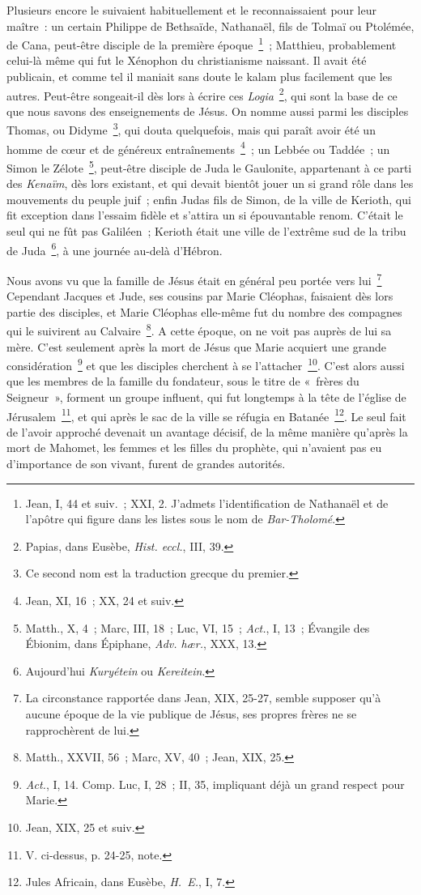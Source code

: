 \documentclass[french,twoside]{book} %
\begin{document}
Plusieurs encore le suivaient habituellement et le reconnaissaient pour leur maître : un certain Philippe de Bethsaïde, Nathanaël, fils de Tolmaï ou Ptolémée, de Cana, peut-être disciple de la première époque \footnote{ Jean, I, 44 et suiv. ; XXI, 2. J’admets l’identification de Nathanaël et de l’apôtre qui figure dans les listes sous le nom de {\itshape Bar-Tholomé}.} ; Matthieu, probablement celui-là même qui fut le Xénophon du christianisme naissant. Il avait été publicain, et comme tel il maniait sans doute le kalam plus facilement que les autres. Peut-être songeait-il dès lors à écrire ces {\itshape Logia} \footnote{ Papias, dans Eusèbe, {\itshape Hist. eccl.}, III, 39.}, qui sont la base de ce que nous savons des enseignements de Jésus. On nomme aussi parmi les disciples Thomas, ou Didyme \footnote{Ce second nom est la traduction grecque du premier.}, qui douta quelquefois, mais qui paraît avoir été un homme de cœur et de généreux entraînements \footnote{Jean, XI, 16 ; XX, 24 et suiv.} ; un Lebbée ou Taddée ; un Simon le Zélote \footnote{ Matth., X, 4 ; Marc, III, 18 ; Luc, VI, 15 ; {\itshape Act.}, I, 13 ; Évangile des Ébionim, dans Épiphane, {\itshape Adv. hær.}, XXX, 13.}, peut-être disciple de Juda le Gaulonite, appartenant à ce parti des {\itshape Kenaïm}, dès lors existant, et qui devait bientôt jouer un si grand rôle dans les mouvements du peuple juif ; enfin Judas fils de Simon, de la ville de Kerioth, qui fit exception dans l’essaim fidèle et s’attira un si épouvantable renom. C’était le seul qui ne fût pas Galiléen ; Kerioth était une ville de l’extrême sud de la tribu de Juda \footnote{ Aujourd’hui {\itshape Kuryétein} ou {\itshape Kereitein}.}, à une journée au-delà d’Hébron.\par
Nous avons vu que la famille de Jésus était en général peu portée vers lui \footnote{La circonstance rapportée dans Jean, XIX, 25-27, semble supposer qu’à aucune époque de la vie publique de Jésus, ses propres frères ne se rapprochèrent de lui.} Cependant Jacques et Jude, ses cousins par Marie Cléophas, faisaient dès lors partie des disciples, et Marie Cléophas elle-même fut du nombre des compagnes qui le suivirent au Calvaire \footnote{Matth., XXVII, 56 ; Marc, XV, 40 ; Jean, XIX, 25.}. A cette époque, on ne voit pas auprès de lui sa mère. C’est seulement après la mort de Jésus que Marie acquiert une grande considération \footnote{{\itshape Act.}, I, 14. Comp. Luc, I, 28 ; II, 35, impliquant déjà un grand respect pour Marie.} et que les disciples cherchent à se l’attacher \footnote{Jean, XIX, 25 et suiv.}. C’est alors aussi que les membres de la famille du fondateur, sous le titre de « frères du Seigneur », forment un groupe influent, qui fut longtemps à la tête de l’église de Jérusalem \footnote{V. ci-dessus, p. 24-25, note.}, et qui après le sac de la ville se réfugia en Batanée \footnote{ Jules Africain, dans Eusèbe, {\itshape H. E.}, I, 7.}. Le seul fait de l’avoir approché devenait un avantage décisif, de la même manière qu’après la mort de Mahomet, les femmes et les filles du prophète, qui n’avaient pas eu d’importance de son vivant, furent de grandes autorités.\par
\end{document}
